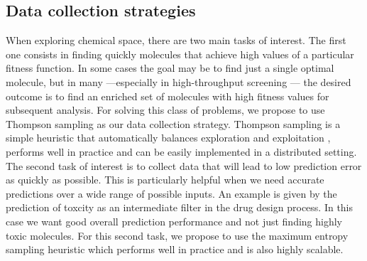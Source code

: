 \subsection{Data collection strategies}

When exploring chemical space, there are two main tasks of interest. The first one consists in finding quickly molecules that achieve high values of a particular fitness function. In some cases the goal may be to find just a single optimal molecule, but in many ---especially in high-throughput screening \cite{Pyzer_Knapp_2015a}--- the desired outcome is to find 
an enriched set of molecules with high fitness values for subsequent analysis. 
For solving this class of problems, we propose to use Thompson sampling \cite{Thompson_1933} as our data collection strategy. Thompson sampling is a simple heuristic that automatically balances exploration and exploitation \cite{Chapelle2011}, performs well in practice and can be easily implemented in a distributed setting.
The second task of interest is to collect data that will lead to low prediction error as quickly as possible. This is particularly helpful when we need accurate predictions over a wide range of possible inputs. An example is given by the prediction of toxcity as an intermediate filter in the drug design process. In this case we want good overall prediction performance and not just finding highly toxic molecules. For this second task, we propose to use the maximum entropy sampling heuristic \cite{MacKay_1992} which performs well in practice and is also highly scalable.